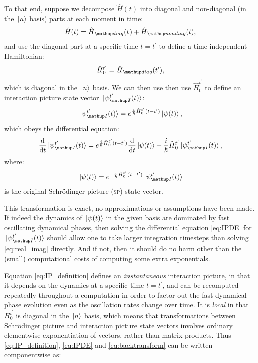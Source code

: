 To that end, suppose we decompose $\hat H(t)$ into diagonal and non-diagonal (in the $\ket{n}$ basis) parts at each moment in time:
\begin{align}
\hat H(t) = \hat H_\up{diag}(t) + \hat H_\up{nondiag}(t),
\end{align}
and use the diagonal part at a specific time $t=t^\prime$ to define a time-independent Hamiltonian:
\begin{align}\label{eq:H0def}
 \hat H_0^{t^\prime} = \hat H_\up{diag}(t^\prime),
\end{align}
which is diagonal in the $\ket{n}$ basis. We can then use then use $\hat H_0^{t^\prime}$ to define an interaction picture state vector $\ket{\psi_\up{I} ^{t^\prime}(t)}$:
\begin{align}\label{eq:IP_definition}
\ket{\psi_\up{I}^{t^\prime}(t)} = e^{\frac i \hbar \hat H_0^{t^\prime}(t - t^\prime)}\ket{\psi(t)},
\end{align}
which obeys the differential equation:
\begin{align}\label{eq:IPDE}
\dv t \ket{\psi_\up{I}^{t^\prime}(t)}
    = e^{\frac i \hbar \hat H_0^{t^\prime}(t - t^\prime)}\dv t \ket{\psi(t)}
      + \frac i\hbar \hat H_0^{t^\prime}\ket{\psi_\up{I}^{t^\prime}(t)},
\end{align}
where:
\begin{align}\label{eq:backtransform}
\ket{\psi(t)} = e^{-\frac i \hbar \hat H_0^{t^\prime}(t - t^\prime)}\ket{\psi_\up{I}^{t^\prime}(t)}
\end{align}
is the original Schrödinger picture (\textsc{sp}) state vector.

This transformation is exact, no approximations or assumptions have been made. If indeed the dynamics of $\ket{\psi(t)}$ in the given basis are dominated by fast oscillating dynamical phases, then solving the differential equation \eqref{eq:IPDE} for $\ket{\psi_\up{I}^{t^\prime}(t)}$ should allow one to take larger integration timesteps than solving \eqref{eq:real_imag} directly. And if not, then it should do no harm other than the (small) computational costs of computing some extra exponentials.

Equation \eqref{eq:IP_definition} defines an \emph{instantaneous} interaction picture, in that it depends on the dynamics at a specific time $t=t^\prime$, and can be recomputed repeatedly throughout a computation in order to factor out the fast dynamical phase evolution even as the oscillation rates change over time. It is \emph{local} in that $H_0^{t^\prime}$ is diagonal in the $\ket{n}$ basis, which means that transformations between Schrödinger picture and interaction picture state vectors involves ordinary elementwise exponentiation of vectors, rather than matrix products. Thus \eqref{eq:IP_definition}, \eqref{eq:IPDE} and \eqref{eq:backtransform} can be written componentwise as:

